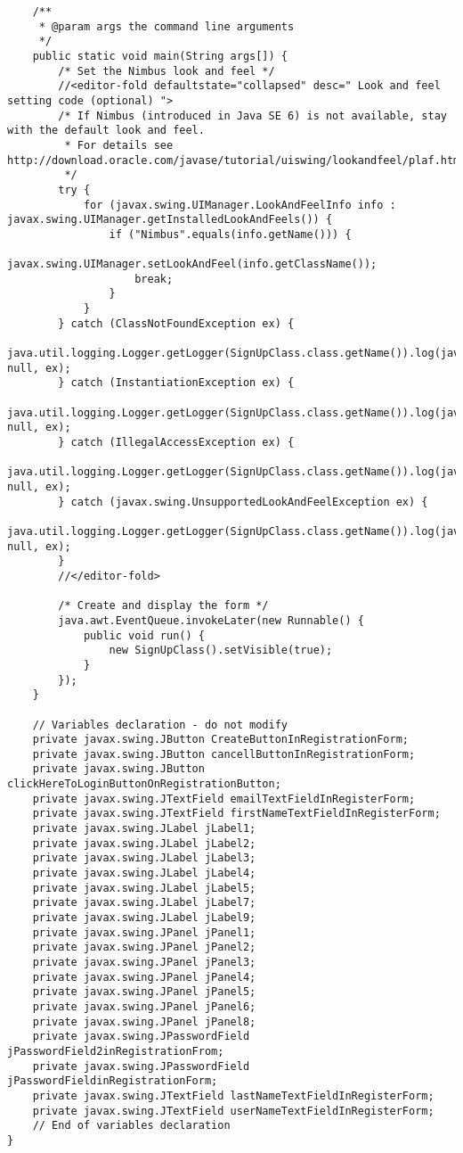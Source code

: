 \documentclass[12pt,a4paper]{article}
\begin{document}
\begin{lstlisting}
    /**
     * @param args the command line arguments
     */
    public static void main(String args[]) {
        /* Set the Nimbus look and feel */
        //<editor-fold defaultstate="collapsed" desc=" Look and feel setting code (optional) ">
        /* If Nimbus (introduced in Java SE 6) is not available, stay with the default look and feel.
         * For details see http://download.oracle.com/javase/tutorial/uiswing/lookandfeel/plaf.html 
         */
        try {
            for (javax.swing.UIManager.LookAndFeelInfo info : javax.swing.UIManager.getInstalledLookAndFeels()) {
                if ("Nimbus".equals(info.getName())) {
                    javax.swing.UIManager.setLookAndFeel(info.getClassName());
                    break;
                }
            }
        } catch (ClassNotFoundException ex) {
            java.util.logging.Logger.getLogger(SignUpClass.class.getName()).log(java.util.logging.Level.SEVERE, null, ex);
        } catch (InstantiationException ex) {
            java.util.logging.Logger.getLogger(SignUpClass.class.getName()).log(java.util.logging.Level.SEVERE, null, ex);
        } catch (IllegalAccessException ex) {
            java.util.logging.Logger.getLogger(SignUpClass.class.getName()).log(java.util.logging.Level.SEVERE, null, ex);
        } catch (javax.swing.UnsupportedLookAndFeelException ex) {
            java.util.logging.Logger.getLogger(SignUpClass.class.getName()).log(java.util.logging.Level.SEVERE, null, ex);
        }
        //</editor-fold>

        /* Create and display the form */
        java.awt.EventQueue.invokeLater(new Runnable() {
            public void run() {
                new SignUpClass().setVisible(true);
            }
        });
    }

    // Variables declaration - do not modify                     
    private javax.swing.JButton CreateButtonInRegistrationForm;
    private javax.swing.JButton cancellButtonInRegistrationForm;
    private javax.swing.JButton clickHereToLoginButtonOnRegistrationButton;
    private javax.swing.JTextField emailTextFieldInRegisterForm;
    private javax.swing.JTextField firstNameTextFieldInRegisterForm;
    private javax.swing.JLabel jLabel1;
    private javax.swing.JLabel jLabel2;
    private javax.swing.JLabel jLabel3;
    private javax.swing.JLabel jLabel4;
    private javax.swing.JLabel jLabel5;
    private javax.swing.JLabel jLabel7;
    private javax.swing.JLabel jLabel9;
    private javax.swing.JPanel jPanel1;
    private javax.swing.JPanel jPanel2;
    private javax.swing.JPanel jPanel3;
    private javax.swing.JPanel jPanel4;
    private javax.swing.JPanel jPanel5;
    private javax.swing.JPanel jPanel6;
    private javax.swing.JPanel jPanel8;
    private javax.swing.JPasswordField jPasswordField2inRegistrationFrom;
    private javax.swing.JPasswordField jPasswordFieldinRegistrationForm;
    private javax.swing.JTextField lastNameTextFieldInRegisterForm;
    private javax.swing.JTextField userNameTextFieldInRegisterForm;
    // End of variables declaration                   
}

	\end{lstlisting}
	
\end{document}
